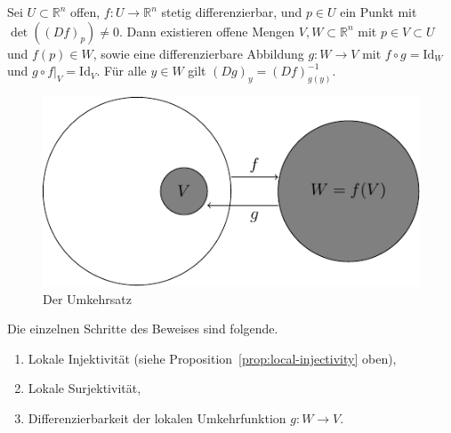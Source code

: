 \documentclass[../main.tex]{subfiles}
\begin{document}
\begin{theorem}[Umkehrsatz]
  Sei $U \subset \mathbb{R}^n$ offen, $f \colon U \to \mathbb{R}^n$ 
  stetig differenzierbar, und $p \in U$ ein Punkt mit
  $\det( {(Df)}_p ) \neq 0$.
  Dann existieren offene Mengen $V, W \subset \mathbb{R}^n$
  mit 
  $p \in V \subset U$ und
  $f(p) \in W$,
  sowie eine differenzierbare Abbildung $g \colon W \to V$ mit
  $f \circ g = \text{Id}_W$ und $g \circ f|_V = \text{Id}_V$.
  Für alle $y \in W$ gilt ${(Dg)}_y = {(Df)}_{g(y)}^{-1}$.
\end{theorem}

\begin{figure}[htb]
  \centering
  \includegraphics{figures/inversefunction}
  \caption{Der Umkehrsatz}%
  \label{fig:inversefunction}
\end{figure}

Die einzelnen Schritte des Beweises sind folgende.
\begin{enumerate}[(1)]
  \item Lokale Injektivität (siehe 
    Proposition~\ref{prop:local-injectivity} oben),
  \item Lokale Surjektivität,
  \item Differenzierbarkeit der lokalen Umkehrfunktion $g \colon W \to V$.
\end{enumerate}
\end{document}
